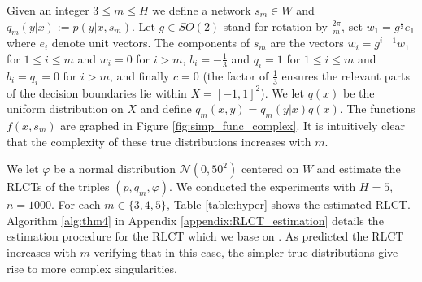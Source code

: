 \documentclass{article} %
\begin{document}
%


Given an integer $3 \le m \le H$ we define a network $s_m \in W$ and $q_m(y|x) := p(y|x, s_m)$. Let $g \in SO(2)$ stand for rotation by $\frac{2\pi}{m}$, set $w_1 = g^{\tfrac{1}{2}} e_1$ where $e_i$ denote unit vectors. The components of $s_m$ are the vectors $w_i = g^{i-1} w_1$ for $1 \le i \le m$ and $w_i = 0$ for $i > m$, $b_i = - \tfrac{1}{3}$ and $q_i = 1$ for $1 \le i \le m$ and $b_i = q_i = 0$ for $i > m$, and finally $c = 0$ (the factor of $\tfrac{1}{3}$ ensures the relevant parts of the decision boundaries lie within $X = [-1,1]^2$). We let $q(x)$ be the uniform distribution on $X$ and define $q_m(x,y) = q_m(y|x) q(x)$. The functions $f(x,s_m)$ are graphed in Figure \ref{fig:simp_func_complex}. It is intuitively clear that the complexity of these true distributions increases with $m$.

We let $\varphi$ be a normal distribution $\mathcal{N}(0,50^2)$ centered on $W$ and estimate the RLCTs of the triples $(p, q_m, \varphi)$. We conducted the experiments with $H = 5$, $n = 1000$. For each $m \in \{3,4,5\}$, Table \ref{table:hyper} shows the estimated RLCT. Algorithm \ref{alg:thm4} in Appendix \ref{appendix:RLCT_estimation} details the estimation procedure for the RLCT which we base on \citep[Theorem 4]{watanabe_widely_2013}. As predicted the RLCT increases with $m$ verifying that in this case, the simpler true distributions give rise to more complex singularities.
\end{document}
